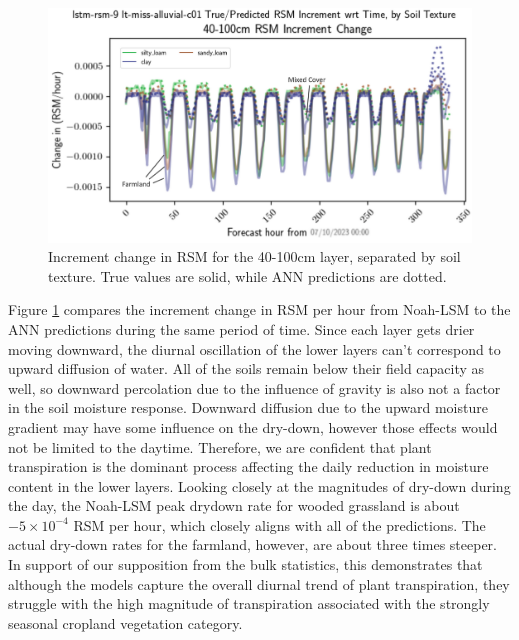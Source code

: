 \begin{figure}[h!p]
    \centering

    \includegraphics[width=.85\linewidth,draft=false]{figures/lt-miss-alluvial/eval-grid_lt-miss-alluvial-c01_lstm-rsm-9_rsm_keep-all_bias_res-seq-textures-all.png}

    \caption{Increment change in RSM for the 40-100cm layer, separated by soil texture. True values are solid, while ANN predictions are dotted.}
    \label{lt_sequence-c01-res_miss-alluvial}
\end{figure}

Figure \ref{lt_sequence-c01-res_miss-alluvial} compares the increment change in RSM per hour from Noah-LSM to the ANN predictions during the same period of time. Since each layer gets drier moving downward, the diurnal oscillation of the lower layers can't correspond to upward diffusion of water. All of the soils remain below their field capacity as well, so downward percolation due to the influence of gravity is also not a factor in the soil moisture response. Downward diffusion due to the upward moisture gradient may have some influence on the dry-down, however those effects would not be limited to the daytime. Therefore, we are confident that plant transpiration is the dominant process affecting the daily reduction in moisture content in the lower layers. Looking closely at the magnitudes of dry-down during the day, the Noah-LSM peak drydown rate for wooded grassland is about $-5\times10^{-4}$ RSM per hour, which closely aligns with all of the predictions. The actual dry-down rates for the farmland, however, are about three times steeper. In support of our supposition from the bulk statistics, this demonstrates that although the models capture the overall diurnal trend of plant transpiration, they struggle with the high magnitude of transpiration associated with the strongly seasonal cropland vegetation category.

